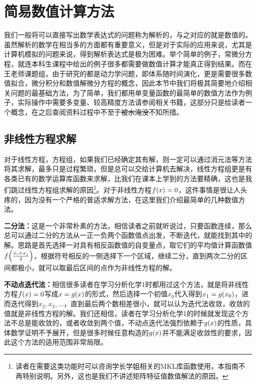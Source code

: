 \documentclass[12pt,a4paper,openany,twoside]{book}
\numberwithin{equation}{section}
\begin{document}
        \section{简易数值计算方法}
          我们一般将可以直接写出数学表达式的问题称为解析的，与之对应的就是数值的。虽然解析的数学在相当多的方面都有重要意义，但是对于实际的应用来说，尤其是计算机模拟的问题来说，得到解析表达式是极为困难。举个简单的例子，常微分方程，就连本科生课程中给出的例子很多都需要做数值计算才能真正得到结果。而在王老师课题组，由于研究的都是动力学问题，即体系随时间演化，更是需要很多数值拟合，微分积分和数值解微分方程的概念，因此本节中我们将极其简要地介绍相关问题的最基础方法，为了简单，我们都用单变量函数的最简单的数值方法作为例子，实际操作中需要多变量、较高精度方法请参阅相关书籍\cite{numerical_calc_methods}，这部分只是给读者一个概念，在之后查阅资料过程中不至于\sout{被水淹没}不知所措。
          \subsection{非线性方程求解}
            对于线性方程，方程组，如果我们已经确定其有解，则一定可以通过消元法等方法将其求解，最多只是过程繁琐，但是总可以交给计算机去解决，线性方程组更是有各类已有的数学运算库函数来求解，比我们在课本上学到的方法要精确，这也是我们跳过线性方程组求解的原因\footnote{读者在需要这类功能时可以咨询学长学姐相关的MKL库函数使用，本指南不再特别说明。另外，这也是我们不讲述矩阵特征值数值解法的原因。}。对于非线性方程$f\qty(x) = 0$，这件事情是很让人头疼的，因为没有一个严格的普适求解方法，在这里我们介绍最简单的几种数值方法。

            \textbf{二分法：}这是一个非常朴素的方法，相信读者之前就听说过，只要函数连续，那么总可以通过二分的方法从一正一负两个函数值点出发，不断迭代，就能找到其中的解。思路是首先选择一对具有相反函数值的自变量点，取它们的平均值计算函数值$f\qty(\frac{x_i + x_j}{2})$，根据符号相反的一侧选择下一个区域，继续二分，直到两次二分的区间都极小，就可以取最后区间的点作为非线性方程的解。

            \textbf{不动点迭代法：}相信很多读者在学习分析化学1时都用过这个方法，就是将非线性方程$f\qty(x)=0$写成$x = g\qty(x)$的形式，然后选择一个初值$x_0$代入得到$x_1 = g\qty(x_0)$，进而迭代得到$x_2,x_3,\dots$，直到最后两个数相差很小，就可以认为迭代法收敛，收敛的值就是非线性方程的解。我们还相信，读者在学习分析化学1的时候就发现这个方法不总是能收敛的，或者收敛到两个值，不动点迭代法强烈依赖于$g\qty(x)$的性质，具体数学证明不予展开，但是很多时候任意构造的$g\qty(x)$并不能满足收敛性的要求，因此这个方法的适用范围非常局限。
\end{document}
